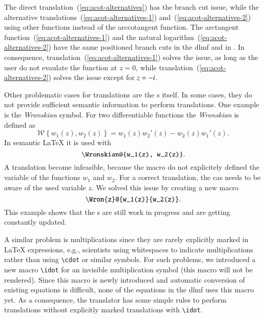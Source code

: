 The direct translation~(\ref{eq:acot-alternatives}) has the branch cut issue, while the alternative translations~(\ref{eq:acot-alternatives-1}) and~(\ref{eq:acot-alternatives-2}) using other functions instead of the arccotangent function. The arctangent function~(\ref{eq:acot-alternatives-1}) and the natural logarithm~(\ref{eq:acot-alternatives-2}) have the same positioned branch cuts in the \gls*{dlmf} and in \Maple. In consequence, translation~(\ref{eq:acot-alternatives-1}) solves the issue, as long as the user do not evaulate the function at $z = 0$, while translation~(\ref{eq:acot-alternatives-2}) solves the issue except for $z = -{i}$.

Other problematic cases for translations are the \Macro s itself. In some cases, they do not provide sufficient semantic information to perform translations. One example is the \textit{Wronskian} symbol. For two differentiable functions the \textit{Wronskian} is defined as~\parencite[eq. 1.13.4]{NIST:DLMF}
\begin{equation*}
	\mathscr{W} \left\{ w_1(z), w_2(z) \right\} = w_1(z)w_2'(z) - w_2(z)w_1'(z).
\end{equation*}
In semantic \LaTeX{} it is used with
\begin{equation}
	\verb|\Wronskian@{w_1(z), w_2(z)}|.
\end{equation}
A translation become infeasible, because the macro do not explicitely defined the variable of the functions $w_1$ and $w_2$. For a correct translation, the \gls*{cas} needs to be aware of the used variable $z$. We solved this issue by creating a new macro
\begin{equation}
	\verb|\Wron{z}@{w_1(z)}{w_2(z)}|.
\end{equation}
This example shows that the \Macro s are still work in progress and are getting constantly updated.

A similar problem is multiplications since they are rarely explicitly marked in \LaTeX{} expressions, e.g., scientists using whitespaces to indicate multiplications rather than using \verb|\cdot| or similar symbols. For such problems, we introduced a new macro \verb|\idot| for an invisible multiplication symbol (this macro will not be rendered). Since this macro is newly introduced and automatic conversion of existing equations is difficult, none of the equations in the \gls*{dlmf} uses this macro yet. As a consequence, the translator has some simple rules to perform translations without explicitly marked translations with \verb|\idot|.


